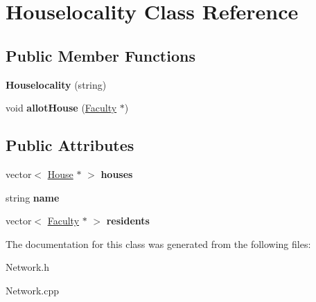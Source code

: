 \hypertarget{classHouselocality}{\section{\-Houselocality \-Class \-Reference}
\label{classHouselocality}
}
\subsection*{\-Public \-Member \-Functions}
\begin{DoxyCompactItemize}
\item 
\hypertarget{classHouselocality_afab4e3dc134e4e72950f1f07159aa9b8}{{\bfseries \-Houselocality} (string)}\label{classHouselocality_afab4e3dc134e4e72950f1f07159aa9b8}

\item 
\hypertarget{classHouselocality_a7a8a0ecb7afed90add340128bd0a5db6}{void {\bfseries allot\-House} (\hyperlink{classFaculty}{\-Faculty} $\ast$)}\label{classHouselocality_a7a8a0ecb7afed90add340128bd0a5db6}

\end{DoxyCompactItemize}
\subsection*{\-Public \-Attributes}
\begin{DoxyCompactItemize}
\item 
\hypertarget{classHouselocality_a56034ed1104ea2d5f9eab7a69c6f5be5}{vector$<$ \hyperlink{classHouse}{\-House} $\ast$ $>$ {\bfseries houses}}\label{classHouselocality_a56034ed1104ea2d5f9eab7a69c6f5be5}

\item 
\hypertarget{classHouselocality_a8af6aa30c84c2a813d19d2ed8ac7364d}{string {\bfseries name}}\label{classHouselocality_a8af6aa30c84c2a813d19d2ed8ac7364d}

\item 
\hypertarget{classHouselocality_a695bb75e0e2fe31b25cc728b4b01df35}{vector$<$ \hyperlink{classFaculty}{\-Faculty} $\ast$ $>$ {\bfseries residents}}\label{classHouselocality_a695bb75e0e2fe31b25cc728b4b01df35}

\end{DoxyCompactItemize}


\-The documentation for this class was generated from the following files\-:\begin{DoxyCompactItemize}
\item 
\-Network.\-h\item 
\-Network.\-cpp\end{DoxyCompactItemize}
